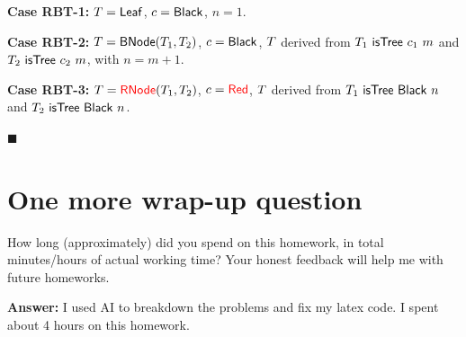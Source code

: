 \documentclass{article}
\begin{document}
\vspace{0.3cm}
\noindent\textbf{Case RBT-1:} $T = \mathsf{Leaf}$, $c = \mathsf{Black}$, $n = 1$.


\vspace{0.3cm}
\noindent\textbf{Case RBT-2:} $T = \mathsf{BNode}(T_1, T_2)$, $c = \mathsf{Black}$,
$T$ derived from $T_1 ~\mathsf{isTree}~c_1~m$ and
$T_2 ~\mathsf{isTree}~c_2~m$, with $n = m+1$.


\vspace{0.3cm}
\noindent\textbf{Case RBT-3:} $T = {\color{red}{\mathsf{RNode}}}(T_1, T_2)$, $c = {\color{red}{\mathsf{Red}}}$,
$T$ derived from $T_1 ~\mathsf{isTree}~\mathsf{Black}~n$ and
$T_2 ~\mathsf{isTree}~\mathsf{Black}~n$.


\hfill$\blacksquare$

\section{One more wrap-up question}

\begin{task}
  How long (approximately) did you spend on this homework, in total
  minutes/hours of
  actual working time?
  Your honest feedback will help me with future homeworks.
\end{task}
\textbf{Answer:}
I used AI to breakdown the problems and fix my latex code. I spent about 4 hours on this homework.
\end{document}
